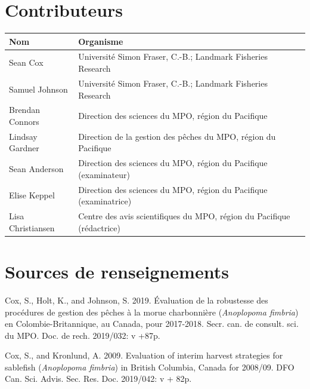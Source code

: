 \documentclass[11pt]{book}
\begin{document}
\hypertarget{contributeurs}{%
\section{Contributeurs}\label{contributeurs}}
\begin{longtable}{>{\raggedright\arraybackslash}p{11em}l}
\toprule
\textbf{Nom} & \textbf{Organisme}\\
\midrule
Sean Cox & Université Simon Fraser, C.-B.; Landmark Fisheries Research\\
Samuel Johnson & Université Simon Fraser, C.-B.; Landmark Fisheries Research\\
Brendan Connors & Direction des sciences du MPO, région du Pacifique\\
Lindsay Gardner & Direction de la gestion des pêches du MPO, région du Pacifique\\
Sean Anderson & Direction des sciences du MPO, région du Pacifique (examinateur)\\
Elise Keppel & Direction des sciences du MPO, région du Pacifique (examinatrice)\\
Lisa Christiansen & Centre des avis scientifiques du MPO, région du Pacifique (rédactrice)\\
\bottomrule
\end{longtable}
\MakeApproval

\hypertarget{sources-de-renseignements}{%
\section{Sources de renseignements}\label{sources-de-renseignements}}

\noindent
\vspace{-2em}
\setlength{\parindent}{-0.2in}
\setlength{\leftskip}{0.2in}
\setlength{\parskip}{8pt}

\hypertarget{refs}{}
\leavevmode\hypertarget{ref-cox2019evaluating}{}%
Cox, S., Holt, K., and Johnson, S. 2019. Évaluation de la robustesse des procédures de gestion des pêches à la morue charbonnière (\emph{Anoplopoma fimbria}) en Colombie-Britannique, au Canada, pour 2017-2018. Secr. can. de consult. sci. du MPO. Doc. de rech. 2019/032: v +87p.

\leavevmode\hypertarget{ref-cox2009evaluation}{}%
Cox, S., and Kronlund, A. 2009. Evaluation of interim harvest strategies for sablefish (\emph{Anoplopoma fimbria}) in British Columbia, Canada for 2008/09. DFO Can. Sci. Advis. Sec. Res. Doc. 2019/042: v + 82p.
\end{document}
